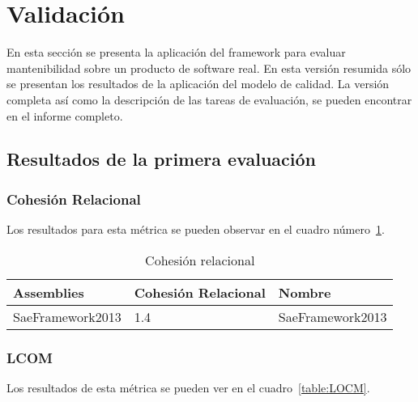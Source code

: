 \documentclass[letterpaper]{article}
\begin{document}
\section{Validación}

En esta sección se presenta la aplicación del framework para evaluar mantenibilidad
sobre un producto de software real. En esta versión resumida sólo se presentan
los resultados de la aplicación del modelo de calidad. La versión completa así como
la descripción de las tareas de evaluación, se pueden encontrar en el informe completo.

\subsection{Resultados de la primera evaluación}

\subsubsection{Cohesión Relacional}

Los resultados para esta métrica se pueden observar en el cuadro número~\ref{table:CR}.

\begin{table}
    \centering
\tiny
    \begin{tabular}{|l|l|l|}
    \hline
       \bf{Assemblies}       & \bf{Cohesión Relacional} & \bf{Nombre}           \\ \hline
       SaeFramework2013 & 1.4                   & SaeFramework2013 \\ \hline
    \end{tabular}
    \caption{Cohesión relacional}
    \label{table:CR}
\end{table}

\subsubsection{LCOM}

Los resultados de esta métrica se pueden ver en el cuadro~\ref{table:LOCM}.
\end{document}
